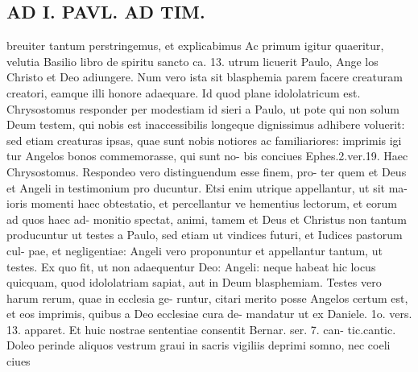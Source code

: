 \documentclass{article}
\begin{document}
\begin{pages}
\section*{AD I. PAVL. AD TIM. }
\marginpar{[ p.33- ]}breuiter tantum perstringemus, et explicabimus Ac primum igitur quaeritur, velutia Basilio libro de spiritu sancto ca. 13. utrum licuerit Paulo, Ange los Christo et Deo adiungere. Num vero ista sit blasphemia parem facere creaturam creatori, eamque illi honore adaequare. Id quod plane idololatricum est. Chrysostomus responder per modestiam id sieri a Paulo, ut pote qui non solum Deum testem, qui nobis est inaccessibilis longeque dignissimus adhibere voluerit: sed etiam creaturas ipsas, quae sunt nobis notiores ac familiariores: imprimis igi tur Angelos bonos commemorasse, qui sunt no- bis conciues Ephes.2.ver.19. Haec Chrysostomus. Respondeo vero distinguendum esse finem, pro- ter quem et Deus et Angeli in testimonium pro ducuntur. Etsi enim utrique appellantur, ut sit ma- ioris momenti haec obtestatio, et percellantur ve hementius lectorum, et eorum ad quos haec ad- monitio spectat, animi, tamem et Deus et Christus non tantum producuntur ut testes a Paulo, sed etiam ut vindices futuri, et Iudices pastorum cul- pae, et negligentiae: Angeli vero proponuntur et appellantur tantum, ut testes. Ex quo fit, ut non adaequentur Deo: Angeli: neque habeat hic locus quicquam, quod idololatriam sapiat, aut in Deum blasphemiam. Testes vero harum rerum, quae in ecclesia ge- runtur, citari merito posse Angelos certum est, et eos imprimis, quibus a Deo ecclesiae cura de- mandatur ut ex Daniele. 1o. vers. 13. apparet. Et huic nostrae sententiae consentit Bernar. ser. 7. can- tic.cantic. Doleo perinde aliquos vestrum graui in sacris vigiliis deprimi somno, nec coeli ciues 

\end{pages}
\end{document}
